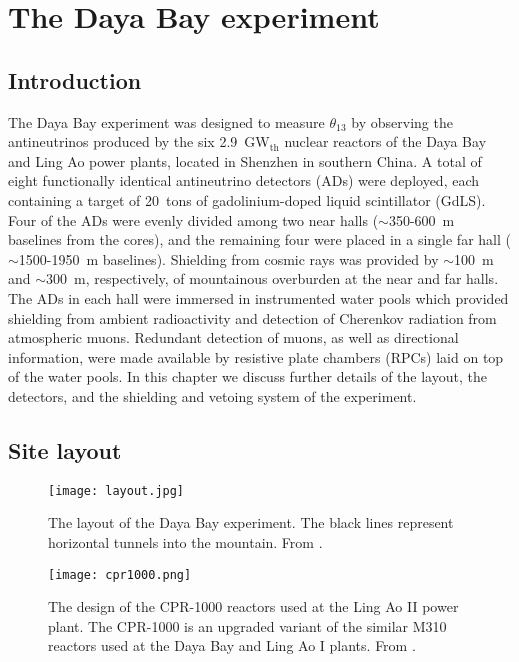 \documentclass[../thesis.tex]{subfiles}
\begin{document}
\chapter{The Daya Bay experiment}
\label{chap:experim}

\section*{Introduction}

The Daya Bay experiment was designed to measure $\theta_{13}$ by observing the antineutrinos produced by the six 2.9~GW$_{\text{th}}$ nuclear reactors of the Daya Bay and Ling Ao power plants, located in Shenzhen in southern China. A total of eight functionally identical antineutrino detectors (ADs) were deployed, each containing a target of 20~tons of gadolinium-doped liquid scintillator (GdLS). Four of the ADs were evenly divided among two near halls ($\sim$350-600~m baselines from the cores), and the remaining four were placed in a single far hall ($\sim$1500-1950~m baselines). Shielding from cosmic rays was provided by $\sim$100~m and $\sim$300~m, respectively, of mountainous overburden at the near and far halls. The ADs in each hall were immersed in instrumented water pools which provided shielding from ambient radioactivity and detection of Cherenkov radiation from atmospheric muons. Redundant detection of muons, as well as directional information, were made available by resistive plate chambers (RPCs) laid on top of the water pools. In this chapter we discuss further details of the layout, the detectors, and the shielding and vetoing system of the experiment.

\section{Site layout}
\label{sec:expLayout}

\begin{figure}[ht]
  \texttt{[image: layout.jpg]}
  \caption{The layout of the Daya Bay experiment. The black lines represent horizontal tunnels into the mountain. From \cite{SideBySide}.}
  \label{fig:layout} 
\end{figure}

\begin{figure}[ht]
  \texttt{[image: cpr1000.png]}
  \caption{The design of the CPR-1000 reactors used at the Ling Ao II power plant. The CPR-1000 is an upgraded variant of the similar M310 reactors used at the Daya Bay and Ling Ao I plants. From \cite{cpr1000}.}
  \label{fig:cpr1000} 
\end{figure}
\end{document}
